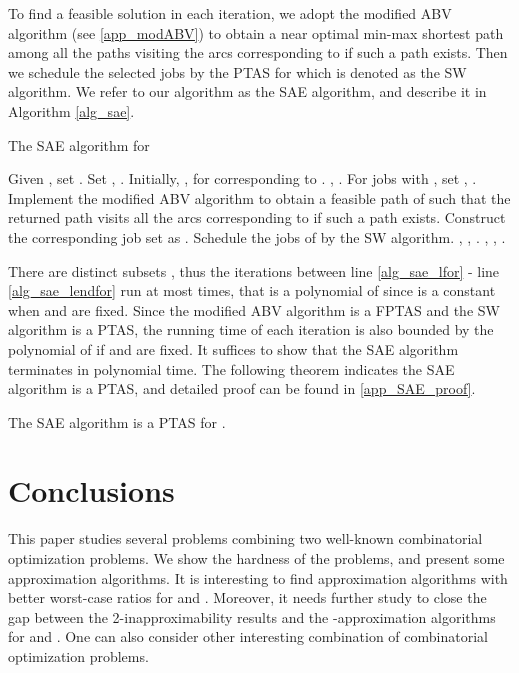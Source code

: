 \documentclass{llncs}
\numberwithin{subcase}{case}
\begin{document}
To find a feasible solution in each iteration, we adopt the modified ABV algorithm (see \ref{app_modABV}) to obtain a near optimal min-max shortest path among all the paths visiting the arcs corresponding to  if such a path exists. Then we schedule the selected jobs by the PTAS for  \cite{Sevastianov1998} which is denoted as the SW algorithm. We refer to our algorithm as the SAE algorithm, and describe it in Algorithm \ref{alg_sae}.

\begin{algorithm}[htb]
\caption{The SAE algorithm for }
\label{alg_sae}
\begin{algorithmic}[1]
\STATE Given , set .
\STATE Set , .
\STATE Initially, , for  corresponding to .
\label{alg_sae_lfor}
\STATE , .
\STATE For jobs  with , set , .
\STATE Implement the modified ABV algorithm to obtain a feasible path  of  such that the returned path visits all the arcs corresponding to  if such a path exists. Construct the corresponding job set as .
\STATE Schedule the jobs of  by the SW algorithm.
\IF{}
        \STATE , , .
    \ENDIF
\ENDFOR\label{alg_sae_lendfor}
\RETURN , , .
\end{algorithmic}
\end{algorithm}

There are  distinct subsets , thus the iterations between line \ref{alg_sae_lfor} - line \ref{alg_sae_lendfor} run at most  times, that is a polynomial of  since  is a constant when  and  are fixed. Since the modified ABV algorithm is a FPTAS and the SW algorithm is a PTAS, the running time of each iteration is also bounded by the polynomial of  if  and  are fixed. It suffices to show that the SAE algorithm terminates in polynomial time. The following theorem indicates the SAE algorithm is a PTAS, and detailed proof can be found in \ref{app_SAE_proof}.

\begin{theorem}
The SAE algorithm is a PTAS for .\label{th_SAE}
\end{theorem}

\section{Conclusions}\label{sec_end}
This paper studies several problems combining two well-known combinatorial optimization problems. We show the hardness of the problems, and present
some approximation algorithms. It is interesting to find approximation algorithms with better worst-case ratios for  and . Moreover, it needs further study to close the gap between the 2-inapproximability results and the -approximation algorithms for  and . One can also consider other interesting combination of combinatorial optimization problems.
\end{document}
